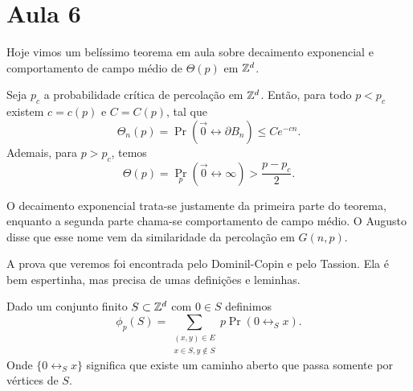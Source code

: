 \section{Aula 6}

Hoje vimos um belíssimo teorema em aula sobre decaimento exponencial
e comportamento
de campo médio de $\Theta(p)$ em $\mathbb{Z}^d$.

\begin{theorem}
	Seja $p_c$ a probabilidade crítica de percolação em $\mathbb{Z}^d$. Então, para todo
	$p < p_c$ existem $c = c(p)$ e $C = C(p)$, tal que
	\[
		\Theta_n(p) = \Pr(\vec{0} \leftrightarrow \partial B_n) \leq Ce^{-cn}.
	\]
	Ademais, para $p > p_c$, temos
	\[
		\Theta(p) = \Pr_p(\vec{0} \leftrightarrow \infty) > \frac{p - p_c}{2}.
	\]
\end{theorem}
\begin{remark}
	O decaimento exponencial trata-se justamente da primeira parte do teorema,
	enquanto a segunda parte chama-se comportamento de campo médio. O Augusto
	disse que esse nome vem da similaridade da percolação em $G(n,p)$.
\end{remark}

A prova que veremos foi encontrada pelo Dominil-Copin e pelo Tassion. Ela é bem
espertinha, mas precisa de umas definições e leminhas.

\begin{definition}
	Dado um conjunto finito $S \subset \mathbb{Z}^d$ com $0 \in S$ definimos
	\[
		\phi_p(S) = \sum_{\substack{(x,y) \in E\\x\in S, y\not \in S}} p
		\Pr(0 \leftrightarrow_S x).
	\]
	Onde $\{0 \leftrightarrow_S x\}$ significa que existe um caminho
	aberto que passa
	somente por vértices de $S$.
\end{definition}

